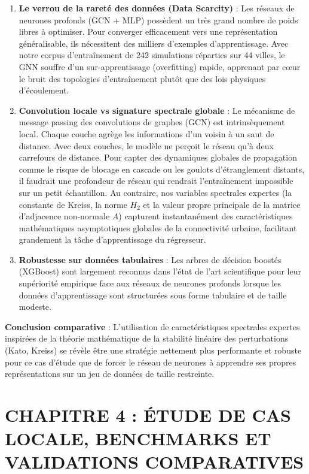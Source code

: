 \documentclass[10pt, a4paper]{article}
\providecommand{\tightlist}{}
\begin{document}
\begin{enumerate}
\def\labelenumi{\arabic{enumi}.}
\tightlist
\item
  \textbf{Le verrou de la rareté des données (Data Scarcity)} : Les
  réseaux de neurones profonds (GCN + MLP) possèdent un très grand
  nombre de poids libres à optimiser. Pour converger efficacement vers
  une représentation généralisable, ils nécessitent des milliers
  d'exemples d'apprentissage. Avec notre corpus d'entraînement de 242
  simulations réparties sur 44 villes, le GNN souffre d'un
  sur-apprentissage (overfitting) rapide, apprenant par cœur le bruit
  des topologies d'entraînement plutôt que des lois physiques
  d'écoulement.
\item
  \textbf{Convolution locale vs signature spectrale globale} : Le
  mécanisme de message passing des convolutions de graphes (GCN) est
  intrinsèquement local. Chaque couche agrège les informations d'un
  voisin à un saut de distance. Avec deux couches, le modèle ne perçoit
  le réseau qu'à deux carrefours de distance. Pour capter des dynamiques
  globales de propagation comme le risque de blocage en cascade ou les
  goulots d'étranglement distants, il faudrait une profondeur de réseau
  qui rendrait l'entraînement impossible sur un petit échantillon. Au
  contraire, nos variables spectrales expertes (la constante de Kreiss,
  la norme \(H_2\) et la valeur propre principale de la matrice
  d'adjacence non-normale \(A\)) capturent instantanément des
  caractéristiques mathématiques asymptotiques globales de la
  connectivité urbaine, facilitant grandement la tâche d'apprentissage
  du régresseur.
\item
  \textbf{Robustesse sur données tabulaires} : Les arbres de décision
  boostés (XGBoost) sont largement reconnus dans l'état de l'art
  scientifique pour leur supériorité empirique face aux réseaux de
  neurones profonds lorsque les données d'apprentissage sont structurées
  sous forme tabulaire et de taille modeste.
\end{enumerate}

\textbf{Conclusion comparative} : L'utilisation de caractéristiques
spectrales expertes inspirées de la théorie mathématique de la stabilité
linéaire des perturbations (Kato, Kreiss) se révèle être une stratégie
nettement plus performante et robuste pour ce cas d'étude que de forcer
le réseau de neurones à apprendre ses propres représentations sur un jeu
de données de taille restreinte.

\newpage

\section{CHAPITRE 4 : ÉTUDE DE CAS LOCALE, BENCHMARKS ET VALIDATIONS
COMPARATIVES}\label{chapitre-4-uxe9tude-de-cas-locale-benchmarks-et-validations-comparatives}
\end{document}
